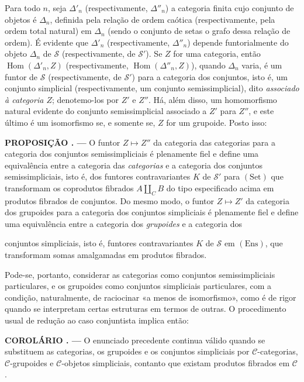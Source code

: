 \documentclass[11pt,twoside,openany]{book}
\numberwithin{equation}{section}
\newcommand{\src}[1]{%
  \phantomsection\hypertarget{src:#1}{}%
  \marginpar{\raggedleft\footnotesize\sffamily #1}%
}
\theoremstyle{plain}
\theoremstyle{definition}
\theoremstyle{remark}
\newcommand{\result}[2]{%
  \par\medskip\noindent\textbf{#1%
  \if\relax\detokenize{#2}\relax\else\space#2\fi. ---}\enspace
}
\newcommand{\FgaUnitKey}{frontmatter}
\renewcommand{\src}[1]{%
  \phantomsection\hypertarget{src:\FgaUnitKey:#1}{}%
  \marginpar{\raggedleft\footnotesize\sffamily #1}%
}
\begin{document}
Para todo $n$, seja $\Delta'_n$ (respectivamente, $\Delta''_n$) a categoria
finita cujo conjunto de objetos é $\Delta_n$, definida pela relação de ordem
caótica (respectivamente, pela ordem total natural) em $\Delta_n$ (sendo o
conjunto de setas o grafo dessa relação de ordem). É evidente que $\Delta'_n$
(respectivamente, $\Delta''_n$) depende funtorialmente do objeto $\Delta_n$ de
$\mathcal S$ (respectivamente, de $\mathcal S'$). Se $Z$ for uma categoria,
então $\operatorname{Hom}(\Delta'_n,Z)$ (respectivamente,
$\operatorname{Hom}(\Delta''_n,Z)$), quando $\Delta_n$ varia, é um funtor de
$\mathcal S$ (respectivamente, de $\mathcal S'$) para a categoria dos
conjuntos, isto é, um conjunto simplicial (respectivamente, um conjunto
semissimplicial), dito \emph{associado à categoria $Z$}; denotemo-los por $Z'$
e $Z''$. Há, além disso, um homomorfismo natural evidente do conjunto
semissimplicial associado a $Z'$ para $Z''$, e este último é um isomorfismo se,
e somente se, $Z$ for um grupoide. Posto isso:

\result{PROPOSIÇÃO}{4.1} O funtor $Z\longmapsto Z''$ da categoria das
categorias para a categoria dos conjuntos semissimpliciais é plenamente fiel
e define uma equivalência entre a categoria das \emph{categorias} e a
categoria dos conjuntos semissimpliciais, isto é, dos funtores contravariantes
$K$ de $\mathcal S'$ para $(\mathrm{Set})$ que transformam os coprodutos
fibrados $A\amalg_C B$ do tipo especificado acima em produtos fibrados de
conjuntos. Do mesmo modo, o funtor $Z\longmapsto Z'$ da categoria dos
grupoides para a categoria dos conjuntos simpliciais é plenamente fiel e
define uma equivalência entre a categoria dos \emph{grupoides} e a categoria
dos
\src{109}
conjuntos simpliciais, isto é, funtores contravariantes $K$ de $\mathcal S$
em $(\mathrm{Ens})$, que transformam somas amalgamadas em produtos fibrados.

Pode-se, portanto, considerar as categorias como conjuntos semissimpliciais
particulares, e os grupoides como conjuntos simpliciais particulares, com a
condição, naturalmente, de raciocinar «a menos de isomorfismo», como é de rigor
quando se interpretam certas estruturas em termos de outras. O procedimento
usual de redução ao caso conjuntista implica então:

\result{COROLÁRIO}{4.2} O enunciado precedente continua válido quando se
substituem as categorias, os grupoides e os conjuntos simpliciais por
$\mathcal C$-categorias, $\mathcal C$-grupoides e $\mathcal C$-objetos
simpliciais, contanto que existam produtos fibrados em $\mathcal C$.
\end{document}
